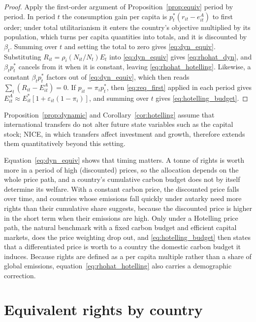 \documentclass[12pt,english]{article}
\theoremstyle{remark}
\begin{document}
\begin{proof}
Apply the first-order argument of Proposition~\ref{prop:equiv} period by period. In period $t$ the consumption gain per capita is $p^*_t(r_{it}-e^A_{it})$ to first order; under total utilitarianism it enters the country's objective multiplied by its population, which turns per capita quantities into totals,
and it is discounted by $\beta_t$. Summing over $t$ and setting the total to zero gives \eqref{eq:dyn_equiv}. Substituting $R_{it}=\rho_i(N_{it}/N_t)E_t$ into \eqref{eq:dyn_equiv} gives \eqref{eq:rhohat_dyn}, and $\beta_t p^*_t$ cancels from it when it is constant, leaving \eqref{eq:rhohat_hotelling}. Likewise, a constant $\beta_t p^*_t$ factors out of \eqref{eq:dyn_equiv}, which then reads $\sum_t (R_{it}-E^A_{it})=0$. If $p_{it}=\pi_i p^*_t$, then \eqref{eq:req_first} applied in each period gives $E^A_{it}\approx E^*_{it}[1+\varepsilon_{it}(1-\pi_i)]$, and summing over $t$ gives \eqref{eq:hotelling_budget}.
\end{proof}

Proposition~\ref{prop:dynamic} and Corollary~\ref{cor:hotelling} assume that international transfers do not alter future state variables such as the capital stock; NICE, in which transfers affect investment and growth, therefore extends them quantitatively beyond this setting.

Equation~\eqref{eq:dyn_equiv} shows that timing matters. A tonne of rights is worth more in a period of high (discounted) prices, so the allocation depends on the whole price path, and a country's cumulative carbon budget does not by itself determine its welfare.
With a constant carbon price, the discounted price falls over time, and countries whose emissions fall quickly under autarky need more rights than their cumulative share suggests, because the discounted price is higher in the short term when their emissions are high.
Only under a Hotelling price path, the natural benchmark with a fixed carbon budget and efficient capital markets, does the price weighting drop out, and \eqref{eq:hotelling_budget} then states that a differentiated price is worth to a country the domestic carbon budget it induces. Because rights are defined as a per capita multiple rather than a share of global emissions, equation~\eqref{eq:rhohat_hotelling} also carries a demographic correction.

\section{Equivalent rights by country}
\label{sec:by_country}
\label{sec:model}
\end{document}
